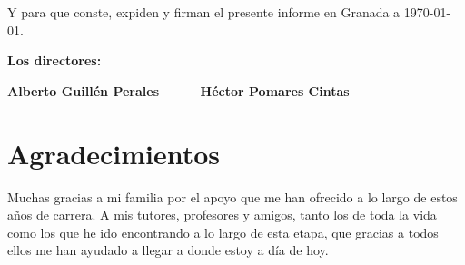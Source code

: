 \vspace{0.5cm}

Y para que conste, expiden y firman el presente informe en Granada a \today.

\vspace{1cm}

\textbf{Los directores:}

\vspace{5cm}

\noindent \textbf{Alberto Guillén Perales \ \ \ \ \ Héctor Pomares Cintas}
\newpage
\chapter*{Agradecimientos}
\thispagestyle{empty}

\vspace{1cm}


Muchas gracias a mi familia por el apoyo que me han ofrecido a lo largo de estos años de carrera. A mis tutores, profesores y amigos, tanto los de toda la vida como los que he ido encontrando a lo largo de esta etapa, que gracias a todos ellos me han ayudado a llegar a donde estoy a día de hoy. \\

\newpage
